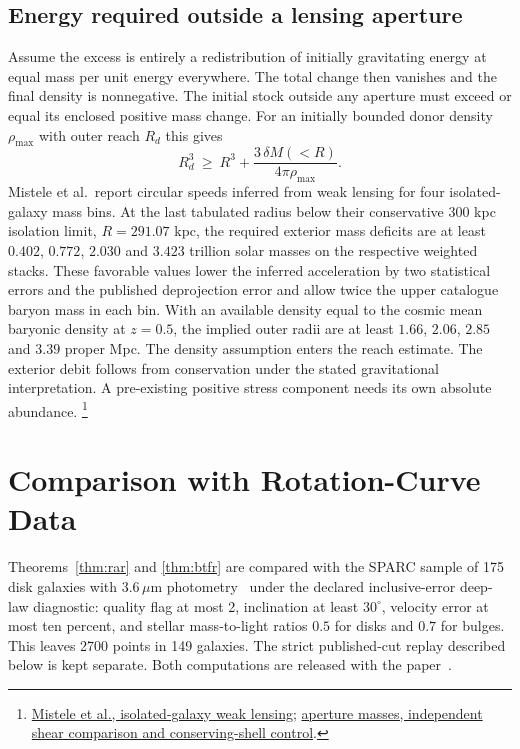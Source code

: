 \documentclass[11pt]{article}
\begin{document}
\subsection{Energy required outside a lensing aperture}

Assume the excess is entirely a redistribution of initially
gravitating energy at equal mass per unit energy everywhere. The
total change then vanishes and the final density is nonnegative.
The initial stock outside any aperture must exceed or equal its
enclosed positive mass change. For an initially bounded donor
density $\rho_{\max}$ with outer reach $R_d$ this gives
\[
  R_d^3 \ \geq\ R^3 + \frac{3\,\delta M(<R)}{4\pi\rho_{\max}} .
\]
Mistele et al.\ report circular speeds inferred from weak lensing
for four isolated-galaxy mass bins. At the last tabulated radius below
their conservative 300 kpc isolation limit, $R=291.07$ kpc, the
required exterior mass deficits are at least $0.402$, $0.772$,
$2.030$ and $3.423$ trillion solar masses on the respective weighted
stacks. These favorable values lower the inferred acceleration by
two statistical errors and the published deprojection error and allow
twice the upper catalogue baryon mass in each bin. With an available
density equal to the cosmic mean baryonic density at $z=0.5$, the
implied outer radii are at least $1.66$, $2.06$, $2.85$ and
$3.39$ proper Mpc. The density assumption enters the reach estimate.
The exterior debit follows from conservation under the stated
gravitational interpretation. A pre-existing positive stress
component needs its own absolute abundance.%
\footnote{\href{https://arxiv.org/abs/2406.09685}{Mistele et al., isolated-galaxy weak lensing};
\href{https://github.com/FloatingPragma/observer-patch-holography/tree/main/code/cosmology/rar_deep_regime/compensation}{aperture masses, independent shear comparison and conserving-shell control}.}

\section{Comparison with Rotation-Curve Data}
\label{sec:data}

Theorems~\ref{thm:rar} and \ref{thm:btfr} are compared with the SPARC sample
of 175 disk galaxies with \(3.6\,\mu\)m photometry~\cite{sparc2016} under the
declared inclusive-error deep-law diagnostic: quality flag at most 2,
inclination at least \(30^\circ\), velocity error at most ten percent, and
stellar mass-to-light ratios \(0.5\) for disks and \(0.7\) for bulges. This
leaves 2700 points in 149 galaxies. The strict published-cut replay described
below is kept separate. Both computations are released with the
paper~\cite{mls2016,ophrar}.
\end{document}
